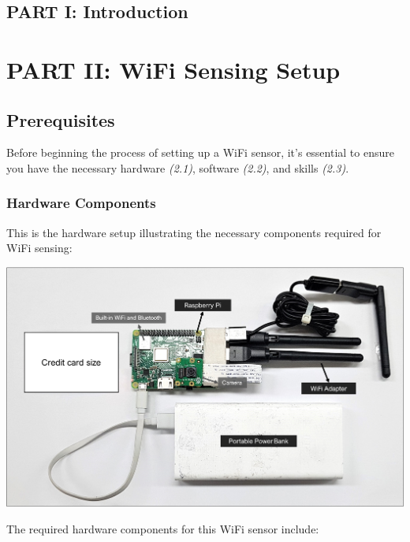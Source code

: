 \documentclass[
  letterpaper,
]{scrbook}
\begin{document}

\chapter*{PART I: Introduction}\label{part-i-introduction}


\part{PART II: WiFi Sensing Setup}

\chapter{Prerequisites}\label{prerequisites}

Before beginning the process of setting up a WiFi sensor, it's essential
to ensure you have the necessary hardware \emph{(2.1)}, software
\emph{(2.2)}, and skills \emph{(2.3)}.

\section{Hardware Components}\label{hardware-components}

This is the hardware setup illustrating the necessary components
required for WiFi sensing:

\includegraphics{content/material/ch2/sensor_comp.png}

The required hardware components for this WiFi sensor include:
\end{document}
